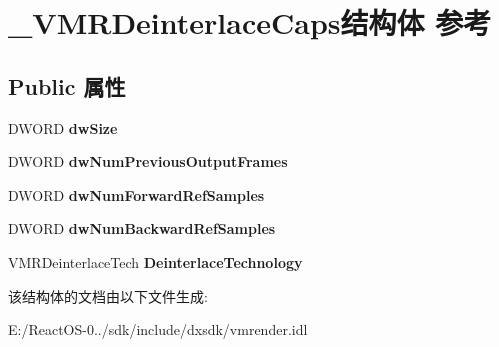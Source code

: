 \hypertarget{struct___v_m_r_deinterlace_caps}{}\section{\+\_\+\+V\+M\+R\+Deinterlace\+Caps结构体 参考}
\label{struct___v_m_r_deinterlace_caps}
\subsection*{Public 属性}
\begin{DoxyCompactItemize}
\item 
\mbox{\label{struct___v_m_r_deinterlace_caps_a2dd91a3a5fd847c0051bdbe537dd2dbc}} 
D\+W\+O\+RD {\bfseries dw\+Size}
\item 
\mbox{\label{struct___v_m_r_deinterlace_caps_ab00516bc1b426c7efa29a8af79e08462}} 
D\+W\+O\+RD {\bfseries dw\+Num\+Previous\+Output\+Frames}
\item 
\mbox{\label{struct___v_m_r_deinterlace_caps_aee9af33f9424112ebc94dc3350728903}} 
D\+W\+O\+RD {\bfseries dw\+Num\+Forward\+Ref\+Samples}
\item 
\mbox{\label{struct___v_m_r_deinterlace_caps_a3e2f641e1890c08b160bae496e96d627}} 
D\+W\+O\+RD {\bfseries dw\+Num\+Backward\+Ref\+Samples}
\item 
\mbox{\label{struct___v_m_r_deinterlace_caps_ac28b47c5be0524440e66c1f50502bc75}} 
V\+M\+R\+Deinterlace\+Tech {\bfseries Deinterlace\+Technology}
\end{DoxyCompactItemize}


该结构体的文档由以下文件生成\+:\begin{DoxyCompactItemize}
\item 
E\+:/\+React\+O\+S-\/0../sdk/include/dxsdk/vmrender.\+idl\end{DoxyCompactItemize}
